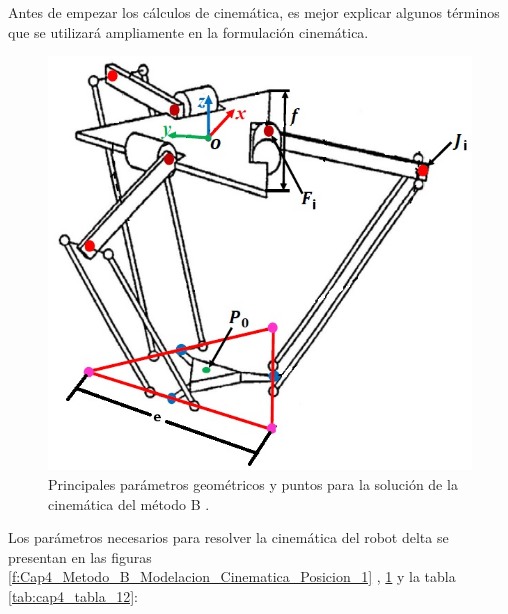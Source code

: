         Antes de empezar los cálculos de cinemática, es mejor explicar algunos términos que se utilizará ampliamente en la formulación cinemática.
        

            \begin{figure}[htb]
                 \centering
                 \includegraphics[width=0.52\linewidth]{Main/Chapter4/Images4/DIBUJO25.jpg}
                  \caption{Principales parámetros geométricos y puntos para la solución de la cinemática
del método B \cite{Path_Planning_and_Trajectory_Optimization}.}
                  \label{f:Cap4_Metodo_B_Modelacion_Cinematica_Posicion_2}
            \end{figure}        
        
        
        
        Los parámetros necesarios para resolver la cinemática del robot delta se presentan en las figuras  \ref{f:Cap4_Metodo_B_Modelacion_Cinematica_Posicion_1} , \ref{f:Cap4_Metodo_B_Modelacion_Cinematica_Posicion_2} y la  tabla \ref{tab:cap4_tabla_12}:
        
